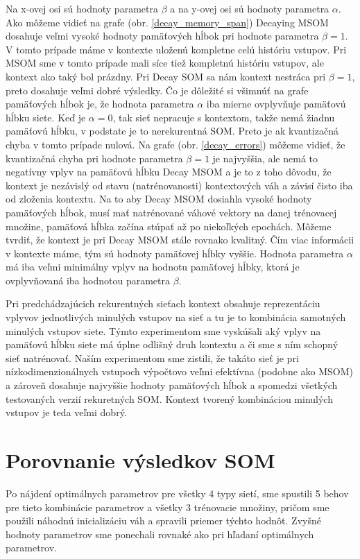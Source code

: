     
Na x-ovej osi sú hodnoty parametra $\beta$ a na y-ovej osi sú hodnoty parametra $\alpha$.
Ako môžeme vidieť na grafe (obr. \ref{decay_memory_span}) Decaying MSOM dosahuje veľmi vysoké hodnoty pamäťových hĺbok pri hodnote 
parametra $\beta = 1$. V tomto prípade máme v kontexte uloženú kompletne celú históriu vstupov. Pri MSOM sme v tomto prípade mali síce tiež kompletnú históriu vstupov, ale kontext ako taký bol prázdny.
Pri Decay SOM sa nám kontext nestráca pri $\beta = 1$, preto dosahuje veľmi dobré výsledky.
Čo je dôležité si všimnúť na grafe
pamäťových hĺbok je, že hodnota parametra $\alpha$ iba mierne ovplyvňuje pamäťovú hĺbku siete. Keď je $\alpha = 0$, tak sieť nepracuje s kontextom, takže nemá žiadnu pamäťovú hĺbku,
v podstate je to nerekurentná SOM. Preto je ak kvantizačná chyba v tomto prípade nulová.
Na grafe (obr. \ref{decay_errors}) môžeme vidieť, že kvantizačná chyba pri hodnote parametra $\beta = 1$ je najvyššia, ale nemá to negatívny 
vplyv na pamäťovú hĺbku Decay MSOM a je to z toho dôvodu, že kontext je nezávislý od stavu (natrénovanosti) kontextových váh a závisí čisto iba od zloženia kontextu.
Na to aby Decay MSOM dosiahla vysoké hodnoty pamäťových hĺbok, musí mať natrénované váhové vektory na danej trénovacej množine, pamäťová hĺbka začína stúpať až
po niekoľkých epochách.
Môžeme tvrdiť, že kontext je pri Decay MSOM stále rovnako kvalitný. Čím viac informácii v kontexte máme, tým sú hodnoty pamäťovej hĺbky vyššie.
Hodnota parametra $\alpha$ má iba veľmi minimálny vplyv na hodnotu pamäťovej hĺbky, ktorá je ovplyvňovaná iba hodnotou parametra $\beta$.

Pri predchádzajúcich rekurentných sieťach kontext obsahuje reprezentáciu vplyvov jednotlivých minulých vstupov na sieť a tu je to kombinácia samotných minulých vstupov siete. 
Týmto experimentom sme vyskúšali aký vplyv na pamäťovú hĺbku siete má úplne odlišný druh kontextu a či sme s ním schopný sieť natrénovať.
Naším experimentom sme zistili, že takáto sieť je pri nízkodimenzionálnych vstupoch výpočtovo veľmi efektívna (podobne ako MSOM) a zároveň dosahuje 
najvyššie hodnoty pamäťových hĺbok a spomedzi všetkých testovaných verzií rekuretných SOM.
Kontext tvorený kombináciou minulých vstupov je teda veľmi dobrý.



\section {Porovnanie výsledkov SOM}
Po nájdení optimálnych parametrov pre všetky 4 typy sietí, sme spustili 5 behov pre tieto kombinácie parametrov a všetky 3 trénovacie množiny,
pričom sme použili náhodnú inicializáciu váh a spravili priemer týchto hodnôt. Zvyšné hodnoty parametrov sme ponechali
rovnaké ako pri hľadaní optimálnych parametrov.

